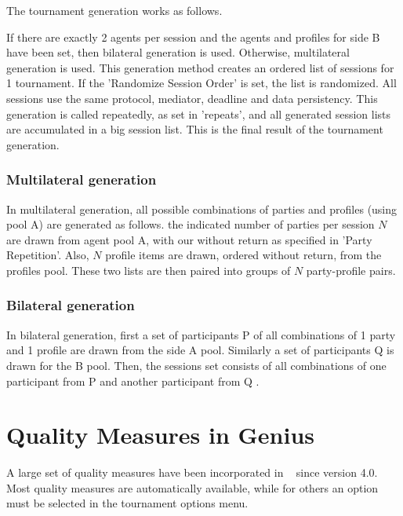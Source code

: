 \documentclass[]{article}
\begin{document}
The tournament generation works as follows. 

If there are exactly 2 agents per session and the agents and profiles for side B have been set, then bilateral generation is used. Otherwise, multilateral generation is used. This generation method creates an ordered list of sessions for 1 tournament.  If the 'Randomize Session Order' is set, the list is randomized. All sessions use the same protocol, mediator, deadline and data persistency.
This generation is called repeatedly, as set in 'repeats', and all generated session lists are accumulated in a big session list. This is the final result of the  tournament generation.

\subsubsection{Multilateral generation}
In multilateral generation,  all possible combinations of parties and profiles (using pool A) are generated as follows. the indicated number of parties per session $N$ are drawn from agent pool A, with our without return as specified in 'Party Repetition'. Also, $N$ profile items are drawn, ordered without return, from the profiles pool. These two lists are then paired into groups of $N$ party-profile pairs. 

\subsubsection{Bilateral generation}
In bilateral generation, first a set of participants P of all combinations of 1 party and 1 profile are drawn from the side A pool. Similarly a set of participants Q is drawn for the B pool. Then, the sessions set consists of all combinations of one participant from P and another participant from Q . 





\section{Quality Measures in Genius}\label{sec:qm}
A large set of quality measures have been incorporated in \Genius~ since version 4.0. Most quality measures are automatically available, while for others an option must be selected in the tournament options menu.
\end{document}
